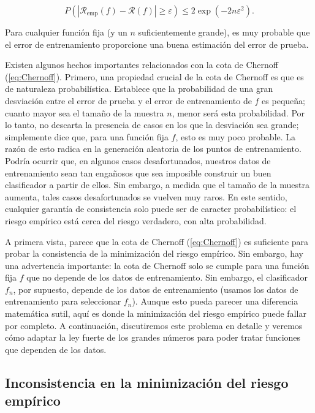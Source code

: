 \documentclass{report}
\begin{document}
\begin{equation}
P(|\mathcal{R}_{\text{emp}}(f) - \mathcal{R}(f)| \geq \varepsilon) \leq 2 \exp(-2n\varepsilon^2).  \label{eq:Chernoff}
\end{equation}

Para cualquier función fija (y un \(n\) suficientemente grande), es muy probable que el error de entrenamiento 
proporcione una buena estimación del error de prueba.\newline

Existen algunos hechos importantes relacionados con la cota de Chernoff (\ref{eq:Chernoff}). Primero, una propiedad crucial 
de la cota de Chernoff es que es de naturaleza probabilística. Establece que la probabilidad de una gran desviación 
entre el error de prueba y el error de entrenamiento de \(f\) es pequeña; cuanto mayor sea el tamaño de la muestra 
\(n\), menor será esta probabilidad. Por lo tanto, no descarta la presencia de casos en los que la desviación sea 
grande; simplemente dice que, para una función fija \(f\), esto es muy poco probable. La razón de esto radica en la 
generación aleatoria de los puntos de entrenamiento. Podría ocurrir que, en algunos casos desafortunados, nuestros 
datos de entrenamiento sean tan engañosos que sea imposible construir un buen clasificador a partir de ellos. Sin 
embargo, a medida que el tamaño de la muestra aumenta, tales casos desafortunados se vuelven muy raros. En este 
sentido, cualquier garantía de consistencia solo puede ser de caracter probabilístico: el riesgo empírico está cerca del riesgo 
verdadero, con alta probabilidad.\newline

A primera vista, parece que la cota de Chernoff (\ref{eq:Chernoff}) es suficiente para probar la consistencia de la minimización 
del riesgo empírico. Sin embargo, hay una advertencia importante: la cota de Chernoff solo se cumple para una función 
fija \(f\) que no depende de los datos de entrenamiento. Sin embargo, el clasificador \(f_n\), por supuesto, depende 
de los datos de entrenamiento (usamos los datos de entrenamiento para seleccionar \(f_n\)). Aunque esto pueda parecer 
una diferencia matemática sutil, aquí es donde la minimización del riesgo empírico puede fallar por completo. A 
continuación, discutiremos este problema en detalle y veremos cómo adaptar la ley fuerte de los grandes números para 
poder tratar funciones que dependen de los datos.\newline

\subsection{Inconsistencia en la minimización del riesgo empírico} \label{Inconsistencia en la minimización del riesgo empírico}
\end{document}
